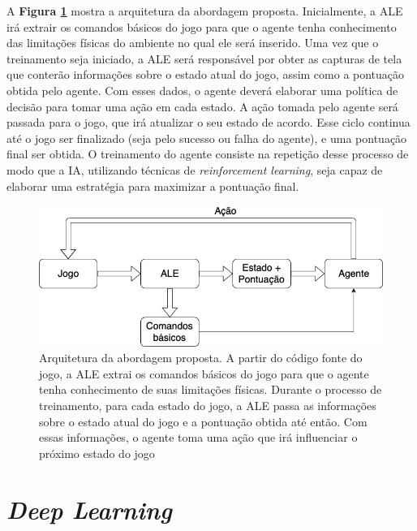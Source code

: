 A \textbf{Figura \ref{arquitetura-abordagem-proposta}} mostra a arquitetura da abordagem proposta. Inicialmente, a ALE irá extrair os comandos básicos do jogo para que o agente tenha conhecimento das limitações físicas do ambiente no qual ele será inserido. Uma vez que o treinamento seja iniciado, a ALE será responsável por obter as capturas de tela que conterão informações sobre o estado atual do jogo, assim como a pontuação obtida pelo agente. Com esses dados, o agente deverá elaborar uma política de decisão para tomar uma ação em cada estado. A ação tomada pelo agente será passada para o jogo, que irá atualizar o seu estado de acordo. Esse ciclo continua até o jogo ser finalizado (seja pelo sucesso ou falha do agente), e uma pontuação final ser obtida. O treinamento do agente consiste na repetição desse processo de modo que a IA, utilizando técnicas de \textit{reinforcement learning}, seja capaz de elaborar uma estratégia para maximizar a pontuação final.

 \begin{figure}[h]
 \centering
 \includegraphics[width=.9 \textwidth]{conteudo/imgs/arquitetura-abordagem-proposta.png}
 \caption[Arquitetura da Abordagem Proposta]{Arquitetura da abordagem proposta. A partir do código fonte do jogo, a ALE extrai os comandos básicos do jogo para que o agente tenha conhecimento de suas limitações físicas. Durante o processo de treinamento, para cada estado do jogo, a ALE passa as informações sobre o estado atual do jogo e a pontuação obtida até então. Com essas informações, o agente toma uma ação que irá influenciar o próximo estado do jogo}
 \label{arquitetura-abordagem-proposta}
 \end{figure}


\section{\textit{Deep Learning}}


